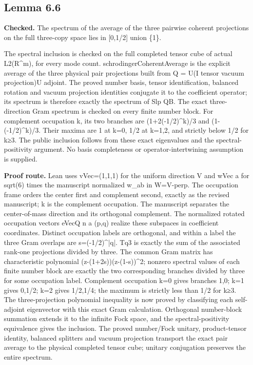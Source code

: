 \subsection{Lemma 6.6}\label{paper:r6-6}
\textbf{Checked.} The spectrum of the average of the three pairwise coherent projections on the full three-copy space lies in [0,1/2] union \{1\}. 

The spectral inclusion is checked on the full completed tensor cube of actual L2(R\textasciicircum{}m), for every mode count. schrodingerCoherentAverage is the explicit average of the three physical pair projections built from Q = U(I tensor vacuum projection)U adjoint. The proved number basis, tensor identification, balanced rotation and vacuum projection identities conjugate it to the coefficient operator; its spectrum is therefore exactly the spectrum of Slp QB. The exact three-direction Gram spectrum is checked on every finite number block. For complement occupation k, its two branches are (1+2(-1/2)\textasciicircum{}k)/3 and (1-(-1/2)\textasciicircum{}k)/3. Their maxima are 1 at k=0, 1/2 at k=1,2, and strictly below 1/2 for k≥3. The public inclusion follows from these exact eigenvalues and the spectral-positivity argument. No basis completeness or operator-intertwining assumption is supplied.

\textbf{Proof route.} Lean uses vVec=(1,1,1) for the uniform direction V and wVec a for sqrt(6) times the manuscript normalized w\_ab in W=V-perp. The occupation frame orders the center first and complement second, exactly as the revised manuscript; k is the complement occupation. The manuscript separates the center-of-mass direction and its orthogonal complement. The normalized rotated occupation vectors eVecQ n a (p,q) realize these subspaces in coefficient coordinates. Distinct occupation labels are orthogonal, and within a label the three Gram overlaps are s=(-1/2)\textasciicircum{}|q|. Tq3 is exactly the sum of the associated rank-one projections divided by three. The common Gram matrix has characteristic polynomial (z-(1+2s))(z-(1-s))\textasciicircum{}2; nonzero spectral values of each finite number block are exactly the two corresponding branches divided by three for some occupation label. Complement occupation k=0 gives branches 1,0; k=1 gives 0,1/2; k=2 gives 1/2,1/4; the maximum is strictly less than 1/2 for k≥3. The three-projection polynomial inequality is now proved by classifying each self-adjoint eigenvector with this exact Gram calculation. Orthogonal number-block summation extends it to the infinite Fock space, and the spectral-positivity equivalence gives the inclusion. The proved number/Fock unitary, product-tensor identity, balanced splitters and vacuum projection transport the exact pair average to the physical completed tensor cube; unitary conjugation preserves the entire spectrum.

